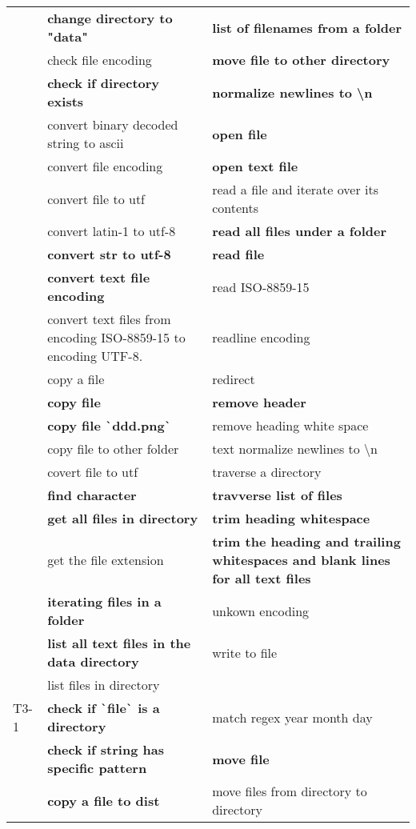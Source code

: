 \begin{longtable}{lLL}
& \textbf{change directory to "data"} & \textbf{list of filenames from a folder} \\
& check file encoding & \textbf{move file to other directory} \\
& \textbf{check if directory exists} & \textbf{normalize newlines to \textbackslash n} \\
& convert binary decoded string to ascii & \textbf{open file} \\
& convert file encoding & \textbf{open text file} \\
& convert file to utf & read a file and iterate over its contents \\
& convert latin-1 to utf-8 & \textbf{read all files under a folder} \\
& \textbf{convert str to utf-8} & \textbf{read file} \\
& \textbf{convert text file encoding} & read ISO-8859-15 \\
& convert text files from encoding ISO-8859-15 to encoding UTF-8. & readline encoding \\
& copy a file & redirect \\
& \textbf{copy file} & \textbf{remove header} \\
& \textbf{copy file \texttt{\`}ddd.png\texttt{\`}} & remove heading white space \\
& copy file to other folder & text normalize newlines to \textbackslash n \\
& covert file to utf & traverse a directory \\
& \textbf{find character} & \textbf{travverse list of files} \\
& \textbf{get all files in directory} & \textbf{trim heading whitespace} \\
& get the file extension & \textbf{trim the heading and trailing whitespaces and blank lines for all text files} \\
& \textbf{iterating files in a folder} & unkown encoding \\
& \textbf{list all text files in the data directory} & write to file \\
& list files in directory \\
T3-1 & \textbf{check if \texttt{\`}file\texttt{\`} is a directory} & match regex year month day \\
& \textbf{check if string has specific pattern} & \textbf{move file} \\
& \textbf{copy a file to dist} & move files from directory to directory \\

\end{longtable}
